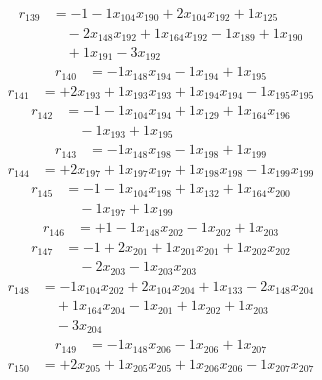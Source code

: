 \[\begin{aligned}
r_{139} &= - 1 - 1 x_{104} x_{190} + 2 x_{104} x_{192} + 1 x_{125} \\
 &\quad - 2 x_{148} x_{192} + 1 x_{164} x_{192} - 1 x_{189} + 1 x_{190} \\
 &\quad + 1 x_{191} - 3 x_{192}
\end{aligned}\]
\[\begin{aligned}
r_{140} &= - 1 x_{148} x_{194} - 1 x_{194} + 1 x_{195}
\end{aligned}\]
\[\begin{aligned}
r_{141} &= + 2 x_{193} + 1 x_{193} x_{193} + 1 x_{194} x_{194} - 1 x_{195} x_{195}
\end{aligned}\]
\[\begin{aligned}
r_{142} &= - 1 - 1 x_{104} x_{194} + 1 x_{129} + 1 x_{164} x_{196} \\
 &\quad - 1 x_{193} + 1 x_{195}
\end{aligned}\]
\[\begin{aligned}
r_{143} &= - 1 x_{148} x_{198} - 1 x_{198} + 1 x_{199}
\end{aligned}\]
\[\begin{aligned}
r_{144} &= + 2 x_{197} + 1 x_{197} x_{197} + 1 x_{198} x_{198} - 1 x_{199} x_{199}
\end{aligned}\]
\[\begin{aligned}
r_{145} &= - 1 - 1 x_{104} x_{198} + 1 x_{132} + 1 x_{164} x_{200} \\
 &\quad - 1 x_{197} + 1 x_{199}
\end{aligned}\]
\[\begin{aligned}
r_{146} &= + 1 - 1 x_{148} x_{202} - 1 x_{202} + 1 x_{203}
\end{aligned}\]
\[\begin{aligned}
r_{147} &= - 1 + 2 x_{201} + 1 x_{201} x_{201} + 1 x_{202} x_{202} \\
 &\quad - 2 x_{203} - 1 x_{203} x_{203}
\end{aligned}\]
\[\begin{aligned}
r_{148} &= - 1 x_{104} x_{202} + 2 x_{104} x_{204} + 1 x_{133} - 2 x_{148} x_{204} \\
 &\quad + 1 x_{164} x_{204} - 1 x_{201} + 1 x_{202} + 1 x_{203} \\
 &\quad - 3 x_{204}
\end{aligned}\]
\[\begin{aligned}
r_{149} &= - 1 x_{148} x_{206} - 1 x_{206} + 1 x_{207}
\end{aligned}\]
\[\begin{aligned}
r_{150} &= + 2 x_{205} + 1 x_{205} x_{205} + 1 x_{206} x_{206} - 1 x_{207} x_{207}
\end{aligned}\]
